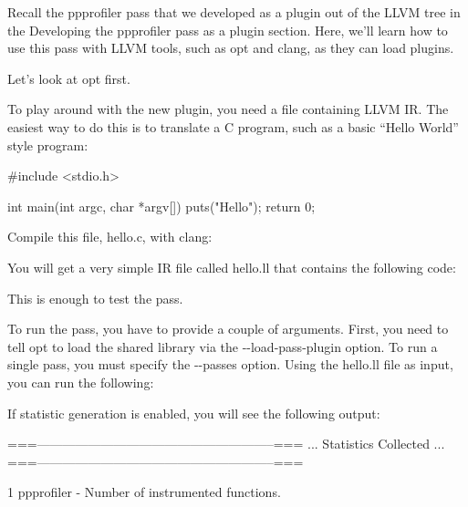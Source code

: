 Recall the ppprofiler pass that we developed as a plugin out of the LLVM tree in the Developing the ppprofiler pass as a plugin section. Here, we’ll learn how to use this pass with LLVM tools, such as opt and clang, as they can load plugins.

Let’s look at opt first.


To play around with the new plugin, you need a file containing LLVM IR. The easiest way to do this is to translate a C program, such as a basic “Hello World” style program:

\begin{cpp}
#include <stdio.h>

int main(int argc, char *argv[]) {
    puts("Hello");
    return 0;
}
\end{cpp}

Compile this file, hello.c, with clang:


You will get a very simple IR file called hello.ll that contains the following code:


This is enough to test the pass.

To run the pass, you have to provide a couple of arguments. First, you need to tell opt to load the shared library via the -{}-load-pass-plugin option. To run a single pass, you must specify the -{}-passes option. Using the hello.ll file as input, you can run the following:


If statistic generation is enabled, you will see the following output:

\begin{shell}
===--------------------------------------------------------===
... Statistics Collected ...
===--------------------------------------------------------===

1 ppprofiler - Number of instrumented functions.
\end{shell}

